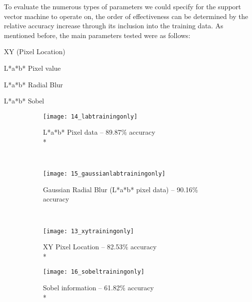 To evaluate the numerous types of parameters we could specify for the support vector machine to operate on, the order of effectiveness can be determined by the relative accuracy increase through its inclusion into the training data.
As mentioned before, the main parameters tested were as follows:
\begin{description}


  \item XY (Pixel Location)
  \item L*a*b* Pixel value
  \item L*a*b* Radial Blur
  \item L*a*b* Sobel
\end{description}
\begin{figure}
        \centering
        \begin{subfigure}[b]{0.3\textwidth}
                \centering
                \texttt{[image: 14\_labtrainingonly]}
                \caption{L*a*b* Pixel data -- 89.87\% accuracy \\*}
                \label{fig:14_labtrainingonly}
        \end{subfigure}%
        ~ %
        \begin{subfigure}[b]{0.3\textwidth}
                \centering

                \texttt{[image: 15\_gaussianlabtrainingonly]}
                \caption{Gaussian Radial Blur (L*a*b* pixel data) -- 90.16\% accuracy}
                \label{fig:15_gaussianlabtrainingonly}     
        \end{subfigure}
        ~ %
        \begin{subfigure}[b]{0.3\textwidth}
                \centering

                \texttt{[image: 13\_xytrainingonly]}
                \caption{XY Pixel Location -- 82.53\% accuracy \\*}
                \label{fig:13_xytrainingonly}
        \end{subfigure}
         \begin{subfigure}[b]{0.3\textwidth}
                \centering

                \texttt{[image: 16\_sobeltrainingonly]}
                \caption{Sobel information -- 61.82\% accuracy \\*}
                \label{fig:16_sobeltrainingonly}
        \end{subfigure}
        \begin{subfigure}[b]{0.3\textwidth}
                \centering


\end{subfigure}
\end{figure}
